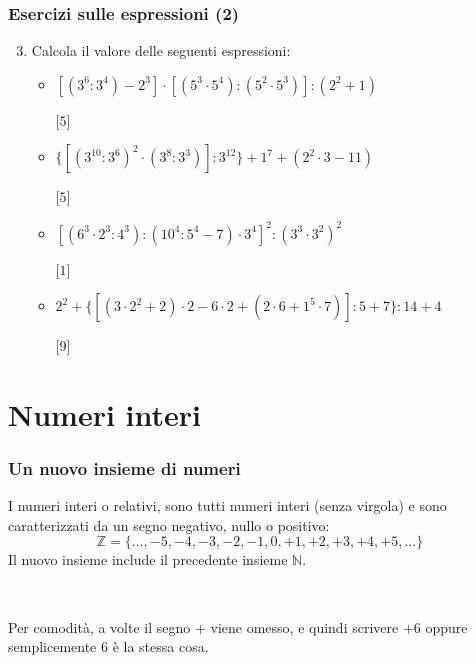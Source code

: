 \documentclass[handout]{beamer}
\theoremstyle{plain}
\begin{document}
\begin{frame}
\frametitle{Esercizi sulle espressioni (2)}
\begin{enumerate}\setcounter{enumi}{2}
  \item Calcola il valore delle seguenti espressioni:
  \vspace*{.15cm}
  \begin{itemize}
    \item $  [(3^6 : 3^4) - 2^3] \cdot [(5^3 \cdot 5^4) : (5^2 \cdot 5^3)] : (2^2 + 1) $
    
    \hspace{\fill}[$ 5 $]
    \vspace*{.25cm}
    \item $  \{[(3^{10} : 3^6)^2 \cdot (3^8:3^3)] : 3^{12}\} + 1^7 + (2^2 \cdot 3 - 11) $
    
    \hspace{\fill}[$ 5 $]
    \vspace*{.25cm}
    \item $  [(6^3\cdot 2^3 : 4^3) : (10^4 : 5^4 - 7)\cdot 3^4]^2 : (3^3\cdot 3^2)^2 $
    
    \hspace{\fill}[$ 1 $]
    \vspace*{.25cm}
    \item $ 2^2 + \{[(3 \cdot 2^2 + 2) \cdot 2 - 6 \cdot 2 + (2 \cdot 6 + 1^5 \cdot 7)] : 5 + 7\} : 14 +4 $
    
    \hspace{\fill}[$ 9 $]
  \end{itemize}
\end{enumerate}
\end{frame}


\section{Numeri interi}


\begin{frame}
\frametitle{Un nuovo insieme di numeri}
I numeri interi o relativi, sono tutti numeri interi (senza virgola) e sono caratterizzati da un segno negativo, nullo o positivo:
\[ \mathbb{Z} = \{ \ldots, -5, -4, -3, -2, -1, 0, +1, +2, +3, +4, +5, \ldots \}\]\pause
Il nuovo insieme \alert{include} il precedente insieme $ \mathbb{N} $.

~

\pause
Per comodità, a volte il segno + viene omesso, e quindi scrivere $ +6 $ oppure semplicemente $ 6 $ è la stessa cosa.
\end{frame}
\end{document}
